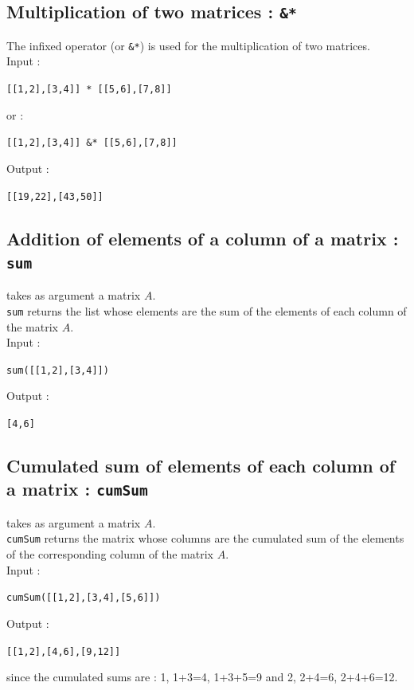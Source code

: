 \documentclass[a4paper,11pt]{book}
\begin{document}
\subsection{Multiplication of two matrices : {\tt * \&*}}\index{*}\index{\&*}
\noindent The infixed operator {\tt *} (or {\tt \&*}) is used for the
multiplication of two matrices.\\
Input :
\begin{center}{\tt [[1,2],[3,4]] * [[5,6],[7,8]]}\end{center}
or :
\begin{center}{\tt [[1,2],[3,4]] \&* [[5,6],[7,8]]}\end{center}
Output :
\begin{center}{\tt [[19,22],[43,50]]}\end{center}

\subsection{Addition of elements of a column of a matrix : {\tt sum}} 
 takes as argument a matrix $A$.\\
{\tt sum} returns the list whose elements are the sum of the elements of each 
column of the matrix $A$.\\
Input :
\begin{center}{\tt sum([[1,2],[3,4]])}\end{center}
Output :
\begin{center}{\tt [4,6]}\end{center}

\subsection{Cumulated sum of elements of each column of a matrix : {\tt cumSum}} 
 takes as argument a matrix $A$.\\
{\tt cumSum} returns the matrix whose columns are the cumulated sum of the
elements of the corresponding column of the matrix $A$.\\
Input :
\begin{center}{\tt cumSum([[1,2],[3,4],[5,6]])}\end{center}
Output :
\begin{center}{\tt [[1,2],[4,6],[9,12]]}\end{center}
since the  cumulated sums are : 1, 1+3=4, 1+3+5=9 and 2, 2+4=6, 2+4+6=12.
\end{document}
